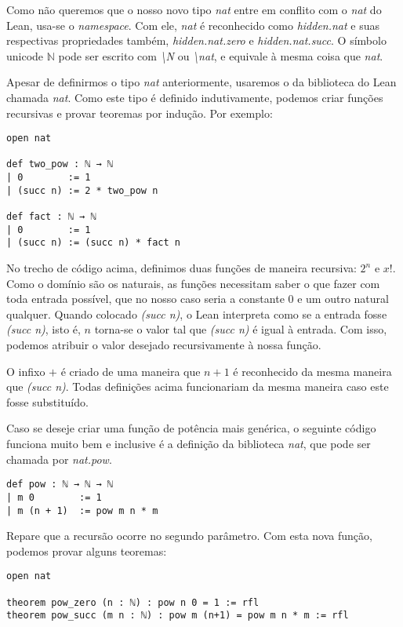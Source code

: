 Como não queremos que o nosso novo tipo \textit{nat} entre em conflito com o \textit{nat} do Lean, usa-se o \textit{namespace}. Com ele, \textit{nat} é reconhecido como \textit{hidden.nat} e suas respectivas propriedades também, \textit{hidden.nat.zero} e \textit{hidden.nat.succ}. O símbolo unicode $\mathbb{N}$ pode ser escrito com \textit{\textbackslash N} ou \textit{\textbackslash nat}, e equivale à mesma coisa que \textit{nat}.

Apesar de definirmos o tipo \textit{nat} anteriormente, usaremos o da biblioteca do Lean chamada \textit{nat}. Como este tipo é definido indutivamente, podemos criar funções recursivas e provar teoremas por indução. Por exemplo:

\begin{lstlisting}
open nat

def two_pow : ℕ → ℕ
| 0        := 1
| (succ n) := 2 * two_pow n

def fact : ℕ → ℕ
| 0        := 1
| (succ n) := (succ n) * fact n
\end{lstlisting}

No trecho de código acima, definimos duas funções de maneira recursiva: $2^n$ e $x!$. Como o domínio são os naturais, as funções necessitam saber o que fazer com toda entrada possível, que no nosso caso seria a constante $0$ e um outro natural qualquer. Quando colocado \textit{(succ n)}, o Lean interpreta como se a entrada fosse \textit{(succ n)}, isto é, $n$ torna-se o valor tal que \textit{(succ n)} é igual à entrada. Com isso, podemos atribuir o valor desejado recursivamente à nossa função.

O infixo $+$ é criado de uma maneira que $n + 1$ é reconhecido da mesma maneira que \textit{(succ n)}. Todas definições acima funcionariam da mesma maneira caso este fosse substituído.

Caso se deseje criar uma função de potência mais genérica, o seguinte código funciona muito bem e inclusive é a definição  da biblioteca \textit{nat}, que pode ser chamada por \textit{nat.pow}.

\begin{lstlisting}
def pow : ℕ → ℕ → ℕ
| m 0        := 1
| m (n + 1)  := pow m n * m
\end{lstlisting}

Repare que a recursão ocorre no segundo parâmetro. Com esta nova função, podemos provar alguns teoremas:

\begin{lstlisting}
open nat

theorem pow_zero (n : ℕ) : pow n 0 = 1 := rfl
theorem pow_succ (m n : ℕ) : pow m (n+1) = pow m n * m := rfl
\end{lstlisting}

